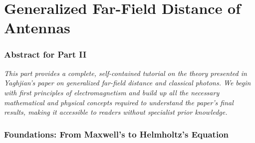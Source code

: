\documentclass[11pt,a4paper]{article}
\begin{document}
\newpage


\part{Generalized Far-Field Distance of Antennas}
\section*{Abstract for Part II}
\textit{This part provides a complete, self-contained tutorial on the theory presented in Yaghjian's paper on generalized far-field distance and classical photons. We begin with first principles of electromagnetism and build up all the necessary mathematical and physical concepts required to understand the paper's final results, making it accessible to readers without specialist prior knowledge.}

\section{Foundations: From Maxwell's to Helmholtz's Equation}
\end{document}
